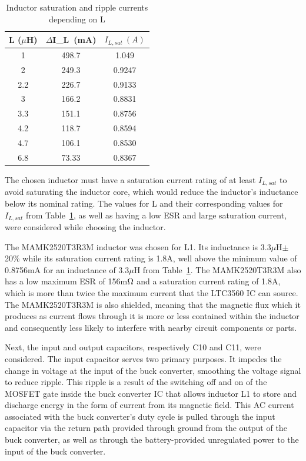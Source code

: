 \begin{table}[H]
\centering
\caption{Inductor saturation and ripple currents depending on L}
\label{tab:inductor_value}
\begin{tabular}{|c|c|c|}
\hline
L (${\mu}$H) & ${\Delta}$I_L~(mA) & $I_{L,sat}~(A)$ \\ \hline
1            & 498.7         & 1.049          \\ \hline
2            & 249.3         & 0.9247         \\ \hline
2.2          & 226.7         & 0.9133         \\ \hline
3            & 166.2         & 0.8831         \\ \hline
3.3          & 151.1         & 0.8756         \\ \hline
4.2          & 118.7         & 0.8594         \\ \hline
4.7          & 106.1         & 0.8530         \\ \hline
6.8          & 73.33         & 0.8367         \\ \hline
\end{tabular}
\end{table}

The chosen inductor must have a saturation current rating of at least $I_{L,sat}$ to avoid saturating the inductor core, which would reduce the inductor's inductance below its nominal rating. The values for L and their corresponding values for $I_{L,sat}$ from Table~\ref{tab:inductor_value}, as well as having a low ESR and large saturation current, were considered while choosing the inductor.

The MAMK2520T3R3M inductor was chosen for L1. Its inductance is 3.3$\mu$H$\pm$20\% while its saturation current rating is 1.8A, well above the minimum value of 0.8756mA for an inductance of 3.3$\mu$H from Table~\ref{tab:inductor_value}. The MAMK2520T3R3M also has a low maximum ESR of 156m$\ohm$ and a saturation current rating of 1.8A, which is more than twice the maximum current that the LTC3560 IC can source. The MAMK2520T3R3M is also shielded, meaning that the magnetic flux which it produces as current flows through it is more or less contained within the inductor and consequently less likely to interfere with nearby circuit components or parts.

Next, the input and output capacitors, respectively C10 and C11, were considered. The input capacitor serves two primary purposes. It impedes the change in voltage at the input of the buck converter, smoothing the voltage signal to reduce ripple. This ripple is a result of the switching off and on of the MOSFET gate inside the buck converter IC that allows inductor L1 to store and discharge energy in the form of current from its magnetic field. This AC current associated with the buck converter's duty cycle is pulled through the input capacitor via the return path provided through ground from the output of the buck converter, as well as through the battery-provided unregulated power to the input of the buck converter.

